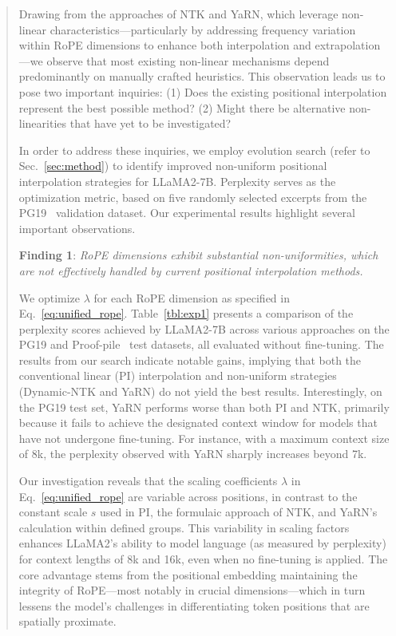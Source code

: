 \begin{abstract}
Drawing from the approaches of NTK and YaRN, which leverage non-linear characteristics—particularly by addressing frequency variation within RoPE dimensions to enhance both interpolation and extrapolation—we observe that most existing non-linear mechanisms depend predominantly on manually crafted heuristics. This observation leads us to pose two important inquiries: (1) Does the existing positional interpolation represent the best possible method? (2) Might there be alternative non-linearities that have yet to be investigated?

In order to address these inquiries, we employ evolution search (refer to Sec.~\ref{sec:method}) to identify improved non-uniform positional interpolation strategies for LLaMA2-7B. Perplexity serves as the optimization metric, based on five randomly selected excerpts from the PG19~\cite{pg19} validation dataset. Our experimental results highlight several important observations.

\textbf{Finding 1}: \textit{RoPE dimensions exhibit substantial non-uniformities, which are not effectively handled by current positional interpolation methods.}

We optimize $\lambda$ for each RoPE dimension as specified in Eq.~\ref{eq:unified_rope}. Table~\ref{tbl:exp1} presents a comparison of the perplexity scores achieved by LLaMA2-7B across various approaches on the PG19 and Proof-pile~\cite{proof-pile} test datasets, all evaluated without fine-tuning. The results from our search indicate notable gains, implying that both the conventional linear (PI) interpolation and non-uniform strategies (Dynamic-NTK and YaRN) do not yield the best results. Interestingly, on the PG19 test set, YaRN performs worse than both PI and NTK, primarily because it fails to achieve the designated context window for models that have not undergone fine-tuning. For instance, with a maximum context size of 8k, the perplexity observed with YaRN sharply increases beyond 7k.

Our investigation reveals that the scaling coefficients $\lambda$ in Eq.~\ref{eq:unified_rope} are variable across positions, in contrast to the constant scale $s$ used in PI, the formulaic approach of NTK, and YaRN's calculation within defined groups. This variability in scaling factors enhances LLaMA2's ability to model language (as measured by perplexity) for context lengths of 8k and 16k, even when no fine-tuning is applied. The core advantage stems from the positional embedding maintaining the integrity of RoPE—most notably in crucial dimensions—which in turn lessens the model's challenges in differentiating token positions that are spatially proximate.


\end{abstract}

